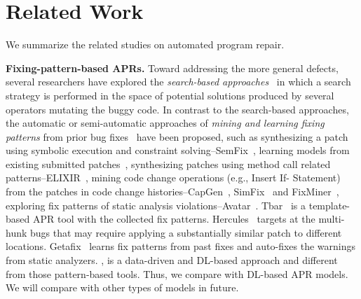\section{Related Work}
We summarize the related studies on automated program repair.

{\bf Fixing-pattern-based APRs.} 
%
Toward addressing the more general
defects, several researchers have explored the {\em search-based
	approaches}~\cite{le2011genprog,qi2014strength,LeGoues-icse12,martinez2016astor}
in which a search strategy is performed in the space of potential
solutions produced by several operators mutating the buggy
code. %
%
In contrast to the search-based approaches, the automatic or
semi-automatic approaches of {\em mining and learning fixing patterns}
from prior bug fixes~\cite{le2016history,
  kim2013automatic,nguyen2013semfix,liu2019avatar,tbar-issta19} have
been proposed, such as synthesizing a patch using symbolic execution
and constraint solving--SemFix~\cite{nguyen2013semfix}, learning
models from existing submitted
patches~\cite{long2016automatic,long2017automatic,le2016history},
synthesizing patches using method call related
patterns--ELIXIR~\cite{saha2017elixir}, mining code change operations
(e.g., Insert If- Statement) from the patches in code change
histories--CapGen~\cite{wen2018context},
SimFix~\cite{Simfix} and
FixMiner~\cite{koyuncu2018fixminer}, exploring fix patterns of static
analysis
violations--Avatar~\cite{liu2019avatar}. Tbar~\cite{tbar-issta19} is a
template-based APR tool with the collected fix patterns.
Hercules~\cite{saha2019harnessing} targets at the multi-hunk bugs that
may require applying a substantially similar patch to different
locations.  Getafix~\cite{bader2019getafix} learns fix patterns from
past fixes and auto-fixes the warnings from static analyzers. {\tool},
is a data-driven and DL-based approach and different from
those pattern-based tools. Thus, we compare {\tool} with DL-based
APR models. We will compare with other types of models in future.




